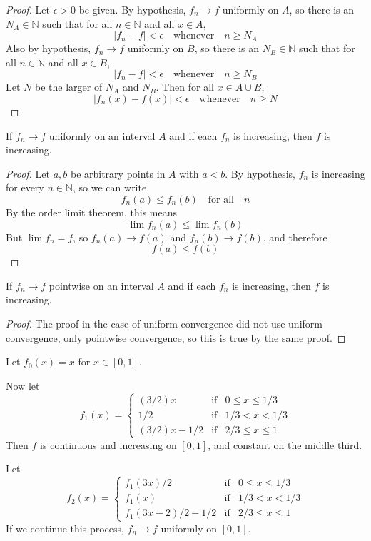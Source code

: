 \begin{proof}
Let $\epsilon>0$ be given.  By hypothesis, $f_n\rightarrow f$ uniformly on $A$, so there is an $N_A\in\mathbb{N}$ such that for all $n\in\mathbb{N}$ and all $x\in A$,
\[
|f_n-f|<\epsilon\quad\mbox{whenever}\quad n\geq N_A
\]
Also by hypothesis, $f_n\rightarrow f$ uniformly on $B$, so there is an $N_B\in\mathbb{N}$ such that for all $n\in\mathbb{N}$ and all $x\in B$,
\[
|f_n-f|<\epsilon\quad\mbox{whenever}\quad n\geq N_B
\]
Let $N$ be the larger of $N_A$ and $N_B$.  Then for all $x\in A\cup B$,
\[
|f_n(x)-f(x)| < \epsilon\quad\mbox{whenever}\quad n\geq N
\]
\end{proof}
\begin{conjecture*}
If $f_n\rightarrow f$ uniformly on an interval $A$ and if each $f_n$ is increasing, then $f$ is increasing.
\end{conjecture*}
\begin{proof}
Let $a,b$ be arbitrary points in $A$ with $a<b$.  By hypothesis, $f_n$ is increasing for every $n\in\mathbb{N}$, so we can write
\[
f_n(a) \leq f_n(b)\quad\mbox{for all}\quad n
\]
By the order limit theorem, this means
\[
\lim f_n(a) \leq \lim f_n(b)
\]
But $\lim f_n=f$, so $f_n(a)\rightarrow f(a)$ and $f_n(b)\rightarrow f(b)$, and therefore
\[
f(a) \leq f(b)
\]
\end{proof}
\begin{conjecture*}
If $f_n\rightarrow f$ pointwise on an interval $A$ and if each $f_n$ is increasing, then $f$ is increasing.
\end{conjecture*}
\begin{proof}
The proof in the case of uniform convergence did not use uniform convergence, only pointwise convergence, so this is true by the same proof.
\end{proof}
\begin{conjecture*}
Let $f_0(x)=x$ for $x\in[0,1]$.
\par\vspace{0.3 cm}
Now let
\[
f_1(x) =\left\{\begin{array}{lcl}
(3/2)x &\mbox{if}& 0\leq x\leq 1/3\\
1/2 &\mbox{if}& 1/3 < x < 1/3\\
(3/2)x-1/2 &\mbox{if}& 2/3\leq x\leq 1\end{array}\right.
\]
Then $f$ is continuous and increasing on $[0,1]$, and constant on the middle third.
\end{conjecture*}
\begin{conjecture*}
Let
\[
f_2(x) =\left\{\begin{array}{lcl}
f_1(3x)/2 &\mbox{if}& 0\leq x\leq 1/3\\
f_1(x) &\mbox{if}& 1/3 < x < 1/3\\
f_1(3x-2)/2-1/2 &\mbox{if}& 2/3\leq x\leq 1\end{array}\right.
\]
If we continue this process, $f_n\rightarrow f$ uniformly on $[0,1]$.
\end{conjecture*}
